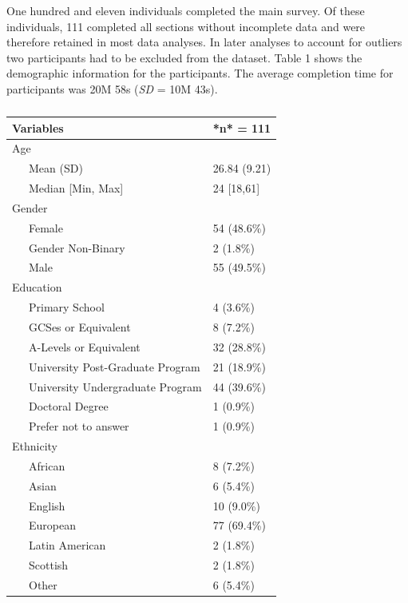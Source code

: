 \documentclass[
  english,
  ,doc, 12pt, a4paper,floatsintext]{apa7}
\begin{document}
One hundred and eleven individuals completed the main survey. Of these individuals, 111 completed all sections without incomplete data and were therefore retained in most data analyses. In later analyses to account for outliers two participants had to be excluded from the dataset. Table 1 shows the demographic information for the participants. The average completion time for participants was 20M 58s (\emph{SD} = 10M 43s).

\begin{table}[tbp]

\begin{center}
\begin{threeparttable}

\caption{\label{tab:unnamed-chunk-1}}

\small{

\begin{tabular}{ll}
\toprule
Variables & *n* = 111\\
\midrule
Age & \\
\ \ \ Mean (SD) & 26.84 (9.21)\\
\ \ \ Median [Min, Max] & 24 [18,61]\\
Gender & \\
\ \ \ Female & 54 (48.6\%)\\
\ \ \ Gender Non-Binary & 2 (1.8\%)\\
\ \ \ Male & 55 (49.5\%)\\
Education & \\
\ \ \ Primary School & 4 (3.6\%)\\
\ \ \ GCSes or Equivalent & 8 (7.2\%)\\
\ \ \ A-Levels or Equivalent & 32 (28.8\%)\\
\ \ \ University Post-Graduate Program & 21 (18.9\%)\\
\ \ \ University Undergraduate Program & 44 (39.6\%)\\
\ \ \ Doctoral Degree & 1 (0.9\%)\\
\ \ \ Prefer not to answer & 1 (0.9\%)\\
Ethnicity & \\
\ \ \ African & 8 (7.2\%)\\
\ \ \ Asian & 6 (5.4\%)\\
\ \ \ English & 10 (9.0\%)\\
\ \ \ European & 77 (69.4\%)\\
\ \ \ Latin American & 2 (1.8\%)\\
\ \ \ Scottish & 2 (1.8\%)\\
\ \ \ Other & 6 (5.4\%)\\
\bottomrule
\end{tabular}

}

\end{threeparttable}
\end{center}

\end{table}
\end{document}
